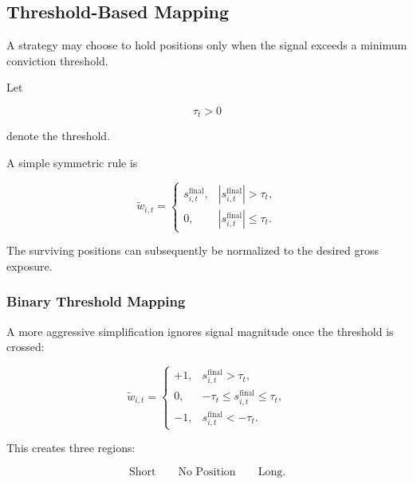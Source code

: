 \documentclass[11pt,a4paper]{article}
\begin{document}
\subsection{Threshold-Based Mapping}
\label{subsec:threshold_based_mapping}

A strategy may choose to hold positions only when the signal exceeds a minimum
conviction threshold.

Let

\begin{equation}
\tau_t>0
\end{equation}

denote the threshold.

A simple symmetric rule is

\begin{equation}
\boxed{
\widetilde{w}_{i,t}
=
\begin{cases}
s_{i,t}^{\mathrm{final}},
&
|s_{i,t}^{\mathrm{final}}|>\tau_t,
\\[0.20cm]
0,
&
|s_{i,t}^{\mathrm{final}}|\leq\tau_t.
\end{cases}
}
\end{equation}

The surviving positions can subsequently be normalized to the desired gross
exposure.


\subsubsection{Binary Threshold Mapping}

A more aggressive simplification ignores signal magnitude once the threshold is
crossed:

\begin{equation}
\boxed{
\widetilde{w}_{i,t}
=
\begin{cases}
+1,
&
s_{i,t}^{\mathrm{final}}>\tau_t,
\\
0,
&
-\tau_t
\leq
s_{i,t}^{\mathrm{final}}
\leq
\tau_t,
\\
-1,
&
s_{i,t}^{\mathrm{final}}<-\tau_t.
\end{cases}
}
\end{equation}

This creates three regions:

\begin{equation}
\boxed{
\text{Short}
\qquad
\text{No Position}
\qquad
\text{Long}.
}
\end{equation}
\end{document}
